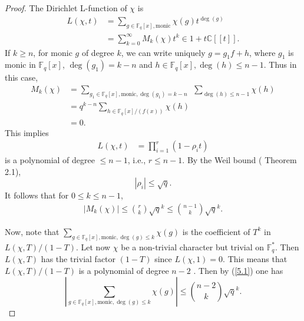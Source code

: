 \documentclass[reqno]{amsart}
\theoremstyle{remark}
\numberwithin{equation}{section}
\newcommand{\f}{\mathbb{F}_q}
\begin{document}
 \begin{proof}
The Dirichlet L-function of $\chi$ is
\begin{align*}
 L(\chi, t)&=\sum_{g\in\f[x], \text{monic}} \chi(g)t^{\deg(g)}\\
 &= \sum_{k=0}^{\infty} M_k(\chi) t^k\in 1+t\mathbb{C}[[t]].
 \end{align*}
  If $k\geq n$, for monic $g$ of degree $k$, we can write uniquely $g=g_1 f+h$, where $g_1$ is monic in $\f[x]$, $\deg(g_1)= k-n$ and $h\in \f[x], \deg(h)\leq n-1$.
  Thus in this case,
  \begin{align*}
M_k(\chi)&=\sum_{g_1\in\f[x], \text{monic}, \deg(g_1)=k-n}~~\sum_{\deg(h)\leq n-1} \chi(h)\\
 &=q^{k-n}\sum_{h\in \f[x]/(f(x))}\chi(h)\\
 &=0.
 \end{align*}
 This implies
 \begin{align*}
 L(\chi, t)&=\prod_{i=1}^r(1-\rho_i t)
 \end{align*}
 is a polynomial of degree $\leq n-1$, i.e., $r\leq n-1$.
 By the Weil bound (\cite{Wan} Theorem 2.1),
 $$|\rho_i|\leq \sqrt{q}.$$
 It follows that for $ 0\leq k \leq n-1$,
 \begin{align}\label{5.1}\left|M_k(\chi)\right|\leq {r \choose k} \sqrt{q}^k\leq {n-1 \choose k} \sqrt{q}^k.
 \end{align}



Now, note that $\sum_{g\in\f[x], \text{monic}, \deg(g)\leq k} \chi(g)$ is the coefficient
     of $T^k$ in $L(\chi, T)/(1-T)$. Let now $\chi$ be a non-trivial character but trivial on
     $\f^*$. Then $L(\chi, T)$ has the trivial factor $(1-T)$ since
     $L(\chi, 1)=0$. This means that $L(\chi, T)/(1-T)$ is a polynomial of degree $n-2$ \cite{Wan}.
Then by (\ref{5.1}) one has
 $$\left| \sum_{g\in\f[x], \text{monic}, \deg(g)\leq k} \chi(g)\right|\leq  {n-2 \choose k} \sqrt{q}^k.$$


%
%

 \end{proof}
\end{document}
